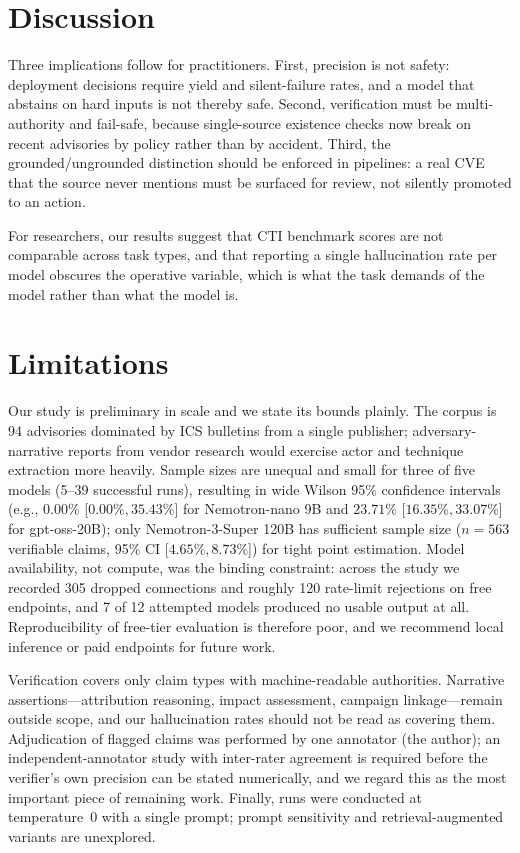 \documentclass[10pt,twocolumn]{article}
\begin{document}
\section{Discussion}

Three implications follow for practitioners. First, precision is not safety:
deployment decisions require yield and silent-failure rates, and a model that
abstains on hard inputs is not thereby safe. Second, verification must be
multi-authority and fail-safe, because single-source existence checks now break
on recent advisories by policy rather than by accident. Third, the
grounded/ungrounded distinction should be enforced in pipelines: a real CVE
that the source never mentions must be surfaced for review, not silently
promoted to an action.

For researchers, our results suggest that CTI benchmark scores are not
comparable across task types, and that reporting a single hallucination rate
per model obscures the operative variable, which is what the task demands of
the model rather than what the model is.

\section{Limitations}
\label{sec:limits}

Our study is preliminary in scale and we state its bounds plainly.
The corpus is 94 advisories dominated by ICS bulletins from a single publisher;
adversary-narrative reports from vendor research would exercise actor and
technique extraction more heavily. Sample sizes are unequal and small for three
of five models (5--39 successful runs), resulting in wide Wilson 95\% confidence intervals (e.g., $0.00\%$ [$0.00\%, 35.43\%$] for Nemotron-nano 9B and $23.71\%$ [$16.35\%, 33.07\%$] for gpt-oss-20B); only Nemotron-3-Super 120B has sufficient sample size ($n=563$ verifiable claims, 95\% CI [$4.65\%, 8.73\%$]) for tight point estimation. Model availability, not compute, was the binding constraint: across the
study we recorded 305 dropped connections and roughly 120 rate-limit rejections
on free endpoints, and 7 of 12 attempted models produced no usable output at
all. Reproducibility of free-tier evaluation is therefore poor, and we
recommend local inference \cite{ollama} or paid endpoints for future work.

Verification covers only claim types with machine-readable authorities.
Narrative assertions---attribution reasoning, impact assessment, campaign
linkage---remain outside scope, and our hallucination rates should not be read
as covering them. Adjudication of flagged claims was performed by one annotator
(the author); an independent-annotator study with inter-rater agreement is
required before the verifier's own precision can be stated numerically, and we
regard this as the most important piece of remaining work. Finally, runs were
conducted at temperature~0 with a single prompt; prompt sensitivity and
retrieval-augmented variants are unexplored.
\end{document}
